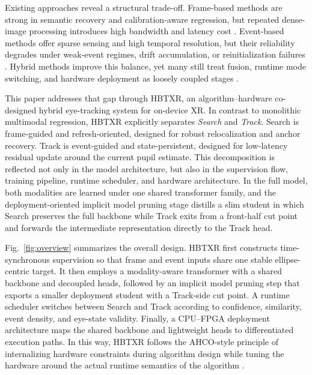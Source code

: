 \documentclass[journal]{IEEEtran}
\begin{document}
Existing approaches reveal a structural trade-off. Frame-based methods are strong in semantic recovery and calibration-aware regression, but repeated dense-image processing introduces high bandwidth and latency cost \cite{ref3}. Event-based methods offer sparse sensing and high temporal resolution, but their reliability degrades under weak-event regimes, drift accumulation, or reinitialization failures \cite{ref4,ref5,ref6}. Hybrid methods improve this balance, yet many still treat fusion, runtime mode switching, and hardware deployment as loosely coupled stages \cite{ref7}.

This paper addresses that gap through HBTXR, an algorithm--hardware co-designed hybrid eye-tracking system for on-device XR. In contrast to monolithic multimodal regression, HBTXR explicitly separates \emph{Search} and \emph{Track}. Search is frame-guided and refresh-oriented, designed for robust relocalization and anchor recovery. Track is event-guided and state-persistent, designed for low-latency residual update around the current pupil estimate. This decomposition is reflected not only in the model architecture, but also in the supervision flow, training pipeline, runtime scheduler, and hardware architecture. In the full model, both modalities are learned under one shared transformer family, and the deployment-oriented implicit model pruning stage distills a slim student in which Search preserves the full backbone while Track exits from a front-half cut point and forwards the intermediate representation directly to the Track head.

Fig.~\ref{fig:overview} summarizes the overall design. HBTXR first constructs time-synchronous supervision so that frame and event inputs share one stable ellipse-centric target. It then employs a modality-aware transformer with a shared backbone and decoupled heads, followed by an implicit model pruning step that exports a smaller deployment student with a Track-side cut point. A runtime scheduler switches between Search and Track according to confidence, similarity, event density, and eye-state validity. Finally, a CPU--FPGA deployment architecture maps the shared backbone and lightweight heads to differentiated execution paths. In this way, HBTXR follows the AHCO-style principle of internalizing hardware constraints during algorithm design while tuning the hardware around the actual runtime semantics of the algorithm \cite{ref12}.
\end{document}
